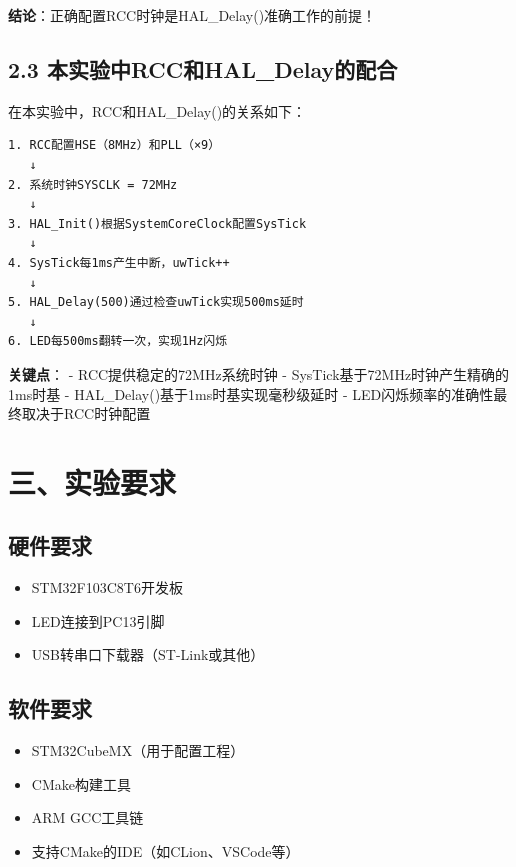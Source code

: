 \documentclass[
  chinese,
  UTF8,
  oneside,
  openany]{ctexbook}
\providecommand{\tightlist}{%
  \setlength{\itemsep}{0pt}\setlength{\parskip}{0pt}}
\begin{document}
\textbf{结论}：正确配置RCC时钟是HAL\_Delay()准确工作的前提！

\subsection{2.3
本实验中RCC和HAL\_Delay的配合}\label{ux672cux5b9eux9a8cux4e2drccux548chal_delayux7684ux914dux5408}

在本实验中，RCC和HAL\_Delay()的关系如下：

\begin{verbatim}
1. RCC配置HSE（8MHz）和PLL（×9）
   ↓
2. 系统时钟SYSCLK = 72MHz
   ↓
3. HAL_Init()根据SystemCoreClock配置SysTick
   ↓
4. SysTick每1ms产生中断，uwTick++
   ↓
5. HAL_Delay(500)通过检查uwTick实现500ms延时
   ↓
6. LED每500ms翻转一次，实现1Hz闪烁
\end{verbatim}

\textbf{关键点}： - RCC提供稳定的72MHz系统时钟 -
SysTick基于72MHz时钟产生精确的1ms时基 -
HAL\_Delay()基于1ms时基实现毫秒级延时 -
LED闪烁频率的准确性最终取决于RCC时钟配置

\section{三、实验要求}\label{ux4e09ux5b9eux9a8cux8981ux6c42}

\subsection{硬件要求}\label{ux786cux4ef6ux8981ux6c42}

\begin{itemize}
\tightlist
\item
  STM32F103C8T6开发板
\item
  LED连接到PC13引脚
\item
  USB转串口下载器（ST-Link或其他）
\end{itemize}

\subsection{软件要求}\label{ux8f6fux4ef6ux8981ux6c42}

\begin{itemize}
\tightlist
\item
  STM32CubeMX（用于配置工程）
\item
  CMake构建工具
\item
  ARM GCC工具链
\item
  支持CMake的IDE（如CLion、VSCode等）
\end{itemize}
\end{document}
